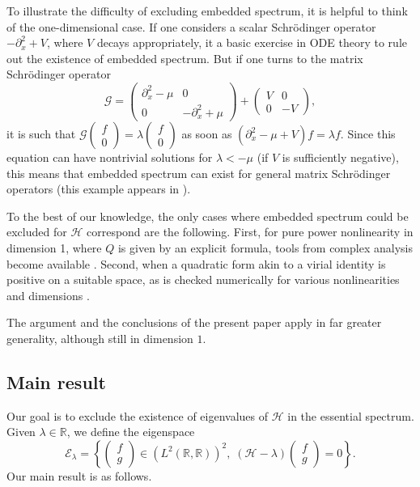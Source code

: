 \documentclass[11 pt]{amsart}
\theoremstyle{definition}
\theoremstyle{remark}
\numberwithin{equation}{section}
\begin{document}
To illustrate the difficulty of excluding embedded spectrum, it is helpful to think of the one-dimensional case. If one considers a scalar Schr\"odinger operator $-\partial_x^2 + V$, where $V$ decays appropriately, it a basic exercise in ODE theory to rule out the existence of embedded spectrum. But if one turns to the matrix Schr\"odinger operator
$$
\mathcal{G} = \left(\begin{array}{cc}
     \partial_x^2 - \mu & 0\\
     0 & - \partial_x^2 + \mu
   \end{array}\right) + \left(\begin{array}{cc}
    V & 0\\
     0 & -V   \end{array}\right),
$$
it is such that $\mathcal{G} \begin{pmatrix} f \\ 0 \end{pmatrix} = \lambda \begin{pmatrix} f \\ 0 \end{pmatrix}$ as soon as $(\partial_x^2 - \mu + V ) f = \lambda f$. Since this equation can have nontrivial solutions for $\lambda < -\mu$ (if $V$ is sufficiently negative), this means that embedded spectrum can exist for general matrix Schr\"odinger operators (this example appears in \cite{KriegerSchlag}).

To the best of our knowledge, the only cases where embedded spectrum could be excluded for $\mathcal{H}$ correspond are the following. First, for pure power nonlinearity in dimension 1, where $Q$ is given by an explicit formula, tools from complex analysis become available \cite{KriegerSchlag, Perelman}. Second, when a quadratic form akin to a virial identity is positive on a suitable space, as is checked numerically for various nonlinearities and dimensions \cite{Marzuola_2011,Asad-Simpson}.

The argument and the conclusions of the present paper apply in far greater generality, although still in dimension $1$.

\subsection{Main result}
Our goal is to exclude the existence of eigenvalues of
$\mathcal{H}$ in the essential spectrum. Given $\lambda \in \mathbb{R}$, we define the eigenspace
\[ \mathcal{E}_{\lambda} = \left\{ \left(\begin{array}{c}
     f\\
     g
   \end{array}\right) \in (L^2 (\mathbb{R}, \mathbb{R}))^2, \; (\mathcal{H}-
   \lambda) \left(\begin{array}{c}
     f\\
     g
   \end{array}\right) = 0 \right\}. \] 
Our main result is as follows.
\end{document}
